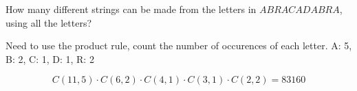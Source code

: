 \documentclass[../main.tex]{subfiles}
\begin{document}
How many different strings can be made from the letters in $ABRACADABRA$, using all the letters?

\solution

Need to use the product rule, count the number of occurences of each letter. A: 5, B: 2, C: 1, D: 1, R: 2

\[ C(11,5)\cdot C(6, 2) \cdot C(4, 1) \cdot C(3, 1) \cdot C(2, 2) = 83160 \]
\end{document}
